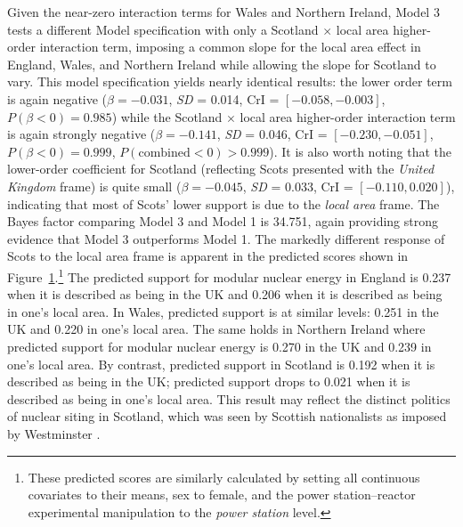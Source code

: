 \documentclass[a4paper, 11pt]{article}
\begin{document}
Given the near-zero interaction terms for Wales and Northern Ireland, Model 3 tests a different Model specification with only a Scotland $\times$ local area higher-order interaction term, imposing a common slope for the local area effect in England, Wales, and Northern Ireland while allowing the slope for Scotland to vary. This model specification yields nearly identical results: the lower order term is again negative ($\beta = -0.031$, \emph{SD} = 0.014, CrI = $[-0.058, -0.003]$, $P(\beta < 0) = 0.985$) while the Scotland $\times$ local area higher-order interaction term is again strongly negative ($\beta = -0.141$, \emph{SD} = 0.046, CrI = $[-0.230, -0.051]$, $P(\beta < 0) = 0.999$, $P(\text{combined} < 0) > 0.999$). It is also worth noting that the lower-order coefficient for Scotland (reflecting Scots presented with the \emph{United Kingdom} frame) is quite small ($\beta = -0.045$, \emph{SD} = 0.033, CrI = $[-0.110, 0.020]$), indicating that most of Scots' lower support is due to the \emph{local area} frame. The Bayes factor comparing Model 3 and Model 1 is 34.751, again providing strong evidence that Model 3 outperforms Model 1. The markedly different response of Scots to the local area frame is apparent in the predicted scores shown in Figure~\ref{fig:pred-local}.\footnote{These predicted scores are similarly calculated by setting all continuous covariates to their means, sex to female, and the power station--reactor experimental manipulation to the \emph{power station} level.} The predicted support for modular nuclear energy in England is 0.237 when it is described as being in the UK and 0.206 when it is described as being in one's local area. In Wales, predicted support is at similar levels: 0.251 in the UK and 0.220 in one's local area. The same holds in Northern Ireland where predicted support for modular nuclear energy is 0.270 in the UK and 0.239 in one's local area. By contrast, predicted support in Scotland is 0.192 when it is described as being in the UK; predicted support drops to 0.021 when it is described as being in one's local area. This result may reflect the distinct politics of nuclear siting in Scotland, which was seen by Scottish nationalists as imposed by Westminster \citep{ross2024}.

\begin{figure}
    \centering
    \label{fig:pred-local}
\end{figure}
\end{document}
